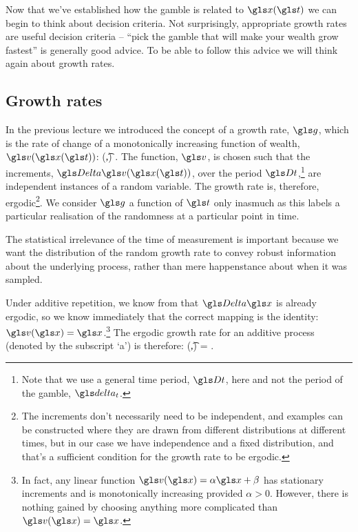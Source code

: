 Now that we've established how the gamble is related to $\x(\t)$ we can 
begin to think about decision criteria. Not surprisingly, appropriate
growth rates are useful decision criteria -- ``pick the gamble that will make
your wealth grow fastest'' is generally good advice. To be able to 
follow this advice we will think again about growth rates.

\subsection{Growth rates}
In the previous lecture we introduced the concept of a growth rate, $\g$, which 
is the rate of change of a monotonically increasing function of wealth, $\gv(\x(\t))$:
\be
\g(\t,\Dt) \equiv \frac{\D \gv(\x(\t))}{\Dt}.
\ee
The function, $\gv$, is chosen such that the increments, $\D \gv(\x(\t))$, over 
the period $\Dt$,\footnote{Note that we use a general time period, $\Dt$, here 
and not the period of the gamble, $\dt$.} are independent instances of a random variable. The growth rate is, therefore, ergodic\footnote{The increments don't necessarily need to be independent, and examples can be constructed where they are drawn from different distributions at different times, but in our case we have independence and a fixed distribution, and that's a sufficient condition for the growth rate to be ergodic.}. We consider $\g$ a function of $\t$ only 
inasmuch as this labels a particular realisation of the randomness at a particular point in time.

The statistical irrelevance of the time of measurement is 
important because we want the distribution of the random growth rate 
to convey robust information about the underlying process, rather than 
mere happenstance about when it was sampled. 

Under additive repetition, we know from  that $\D\x$ is already ergodic, so we know immediately that the correct mapping is the identity: $\gv(\x)=\x$.\footnote{In fact, any linear function $\gv(\x)=\alpha\x+\beta$ has stationary increments and is monotonically increasing provided $\alpha>0$. However, there is nothing gained by choosing anything more complicated than $\gv(\x)=\x$.} The ergodic growth rate for an additive process (denoted by the subscript `a') is therefore:
\be
\gad(\t,\Dt) = \frac{\D\x(\t)}{\Dt}.
\ee

